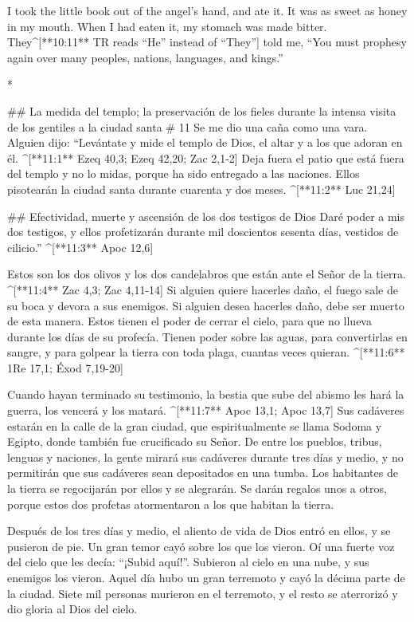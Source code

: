 \begin{paracols}{2}
\begin{english}
 I took the little book out of the angel’s hand, and ate it. It was as sweet as honey in my mouth. When I had eaten it, my stomach was made bitter.  They^[**10:11** TR reads “He” instead of “They”] told me, “You must prophesy again over many peoples, nations, languages, and kings.”

\end{english}
\switchcolumn[0]*

## La medida del templo; la preservación de los fieles durante la intensa visita de los gentiles a la ciudad santa
# 11
 Se me dio una caña como una vara. Alguien dijo: “Levántate y mide el templo de Dios, el altar y a los que adoran en él. ^[**11:1** Ezeq 40,3; Ezeq 42,20; Zac 2,1-2]  Deja fuera el patio que está fuera del templo y no lo midas, porque ha sido entregado a las naciones. Ellos pisotearán la ciudad santa durante cuarenta y dos meses. ^[**11:2** Luc 21,24]

## Efectividad, muerte y ascensión de los dos testigos de Dios
 Daré poder a mis dos testigos, y ellos profetizarán durante mil doscientos sesenta días, vestidos de cilicio.” ^[**11:3** Apoc 12,6]

 Estos son los dos olivos y los dos candelabros que están ante el Señor de la tierra. ^[**11:4** Zac 4,3; Zac 4,11-14]  Si alguien quiere hacerles daño, el fuego sale de su boca y devora a sus enemigos. Si alguien desea hacerles daño, debe ser muerto de esta manera.  Estos tienen el poder de cerrar el cielo, para que no llueva durante los días de su profecía. Tienen poder sobre las aguas, para convertirlas en sangre, y para golpear la tierra con toda plaga, cuantas veces quieran. ^[**11:6** 1Re 17,1; Éxod 7,19-20]

 Cuando hayan terminado su testimonio, la bestia que sube del abismo les hará la guerra, los vencerá y los matará. ^[**11:7** Apoc 13,1; Apoc 13,7]  Sus cadáveres estarán en la calle de la gran ciudad, que espiritualmente se llama Sodoma y Egipto, donde también fue crucificado su Señor.  De entre los pueblos, tribus, lenguas y naciones, la gente mirará sus cadáveres durante tres días y medio, y no permitirán que sus cadáveres sean depositados en una tumba.  Los habitantes de la tierra se regocijarán por ellos y se alegrarán. Se darán regalos unos a otros, porque estos dos profetas atormentaron a los que habitan la tierra.

 Después de los tres días y medio, el aliento de vida de Dios entró en ellos, y se pusieron de pie. Un gran temor cayó sobre los que los vieron.  Oí una fuerte voz del cielo que les decía: “¡Subid aquí!”. Subieron al cielo en una nube, y sus enemigos los vieron.  Aquel día hubo un gran terremoto y cayó la décima parte de la ciudad. Siete mil personas murieron en el terremoto, y el resto se aterrorizó y dio gloria al Dios del cielo.


\end{paracols}

